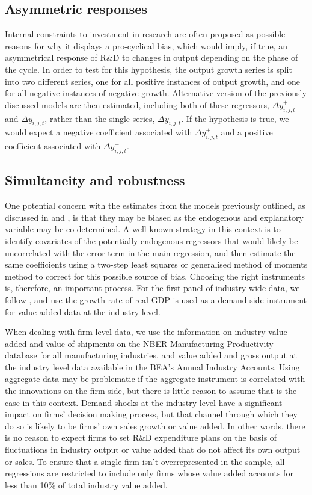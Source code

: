 \documentclass{_latex/house}
\begin{document}
\subsection{Asymmetric responses} \label{asymmetric}
Internal constraints to investment in research are often proposed as possible reasons for why it displays a pro-cyclical bias, which would imply, if true, an asymmetrical response of R\&D to changes in output depending on the phase of the cycle. In order to test for this hypothesis, the output growth series is split into two different series, one for all positive instances of output growth, and one for all negative instances of negative growth. Alternative version of the previously discussed models are then estimated, including both of these regressors, $\Delta y_{i,j,t}^{+}$ and $\Delta y_{i,j,t}^{-}$, rather than the single series, $\Delta y_{i,j,t}$. If the hypothesis is true, we would expect a negative coefficient associated with $\Delta y_{i,j,t}^{+}$ and a positive coefficient associated with $\Delta y_{i,j,t}^{-}$.
\subsection{Simultaneity and robustness} \label{simultaneity}
One potential concern with the estimates from the models previously outlined, as discussed in \cite{RePEc:eea:boewps:wp2011-09} and \cite{JEEA:JEEA1093}, is that they may be biased as the endogenous and explanatory variable may be co-determined. A well known strategy in this context is to identify covariates of the potentially endogenous regressors that would likely be uncorrelated with the error term in the main regression, and then estimate the same coefficients using a two-step least squares or generalised method of moments method to correct for this possible source of bias. Choosing the right instruments is, therefore, an important process. For the first panel of industry-wide data, we follow \cite{RePEc:eea:boewps:wp2011-09}, and  use the growth rate of real GDP is used as a demand side instrument for value added data at the industry level.

When dealing with firm-level data, we use the information on industry value added and value of shipments on the NBER Manufacturing Productivity database for all manufacturing industries, and value added and gross output at the industry level data available in the BEA's Annual Industry Accounts. Using aggregate data may be problematic if the aggregate instrument is correlated with the innovations on the firm side, but there is little reason to assume that is the case in this context. Demand shocks at the industry level have a significant impact on firms' decision making process, but that channel through which they do so is likely to be firms' own sales growth or value added. In other words, there is no reason to expect firms to set R\&D expenditure plans on the basis of fluctuations in industry output or value added that do not affect its own output or sales. To ensure that a single firm isn't overrepresented in the sample, all regressions are restricted to include only firms whose value added accounts for less than 10\% of total industry value added.
\end{document}
